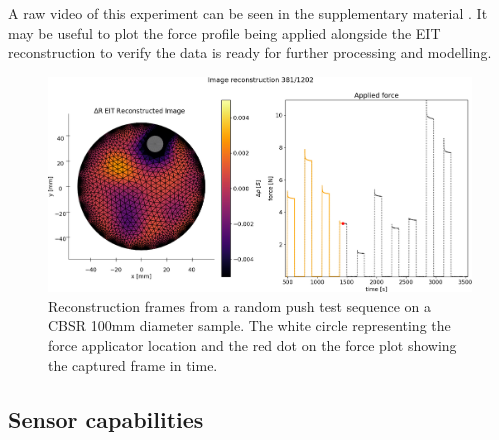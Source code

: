 A raw video of this experiment can be seen in the supplementary material \cite{Ellingham2025}. It may be useful to plot the force profile being applied alongside the EIT reconstruction to verify the data is ready for further processing and modelling. 
\begin{figure}[H]
\centering
\includegraphics[width=0.9\linewidth]{Figures/CBSR_8p_OG_10push_RAND1_strain_120s_1mA_2_frame381.png}
\caption{Reconstruction frames from a random push test sequence on a CBSR 100mm diameter sample. The white circle representing the force applicator location and the red dot on the force plot showing the captured frame in time.}
\label{fig:rand_recon_and force_result}
\end{figure}


\subsection{Sensor capabilities}

